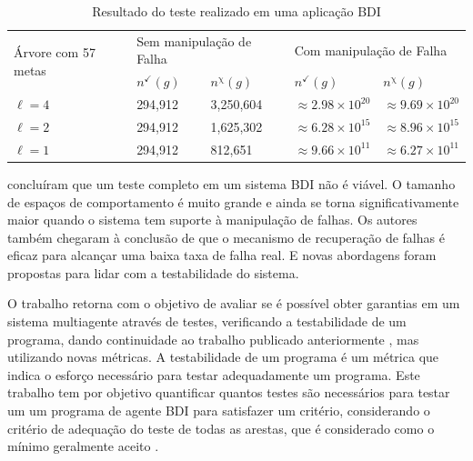 \begin{table}[ht]
\centering
\caption{Resultado do teste realizado em uma aplicação BDI \cite{winikoff2014testability}}
\label{tab:result_ontestability}
\begin{tabular}{@{}lllll@{}}
\toprule
\multirow{2}{*}{Árvore com 57 metas} & \multicolumn{2}{l}{Sem manipulação de Falha} & \multicolumn{2}{l}{Com manipulação de Falha}                  \\
                                        & $n^{\checkmark}(g)$     & $n^{\upchi}(g)$    & $n^{\checkmark}(g)$           & $n^{\upchi}(g)$               \\ \midrule
$\ell = 4$                              & 294,912                 & 3,250,604          & $\approx 2.98 \times 10^{20}$ & $\approx 9.69 \times 10^{20}$ \\
$\ell = 2$                              & 294,912                 & 1,625,302          & $\approx 6.28 \times 10^{15}$ & $\approx 8.96 \times 10^{15}$ \\
$\ell = 1$                              & 294,912                 & 812,651            & $\approx 9.66 \times 10^{11}$ & $\approx 6.27 \times 10^{11}$ \\ \bottomrule
\end{tabular}
\end{table}

\cite{winikoff2014testability} concluíram que um teste completo em um sistema BDI não é viável. O tamanho de espaços de comportamento é muito grande e ainda se torna significativamente maior quando o sistema tem suporte à manipulação de falhas. Os autores também chegaram à conclusão de que o mecanismo de recuperação de falhas é eficaz para alcançar uma baixa taxa de falha real. E novas abordagens foram propostas para lidar com a testabilidade do sistema.


O trabalho \cite{winikoff2017bdi} retorna com o objetivo de avaliar se é possível obter garantias em um sistema multiagente através de testes, verificando a testabilidade de um programa, dando continuidade ao trabalho publicado anteriormente \cite{winikoff2014testability}, mas utilizando novas métricas. A testabilidade de um programa é um métrica que indica o esforço necessário para testar adequadamente um programa. Este trabalho tem por objetivo quantificar quantos testes são necessários para testar um um programa de agente BDI para satisfazer um critério, considerando o critério de adequação do teste de todas as arestas, que é considerado como o mínimo geralmente aceito \cite{jorgensen2016software}. 

